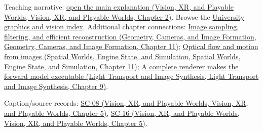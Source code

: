 Teaching narrative: \href{../07-Vision-XR-and-Playable-Worlds/main.pdf\#nameddest=04-visual-computing-ii-ch031-sequence-models-and-attention}{open the main explanation (Vision, XR, and Playable Worlds, Vision, XR, and Playable Worlds, Chapter 2)}. Browse the \hyperref[appendix-a6d556a4ef50-university-graphics-vision-and-photography---independent-series]{University graphics and vision index}. Additional chapter connections: \href{../03-Geometry-Cameras-and-Image-Formation/main.pdf\#nameddest=03-visual-computing-i-ch004-image-sampling-filtering-and-efficient-reconstruction}{Image sampling, filtering, and efficient reconstruction (Geometry, Cameras, and Image Formation, Geometry, Cameras, and Image Formation, Chapter 11)}; \href{../05-Spatial-Worlds-Engine-State-and-Simulation/main.pdf\#nameddest=04-visual-computing-ii-ch030-optical-flow-and-motion-from-images}{Optical flow and motion from images (Spatial Worlds, Engine State, and Simulation, Spatial Worlds, Engine State, and Simulation, Chapter 11)}; \href{../04-Light-Transport-and-Image-Synthesis/main.pdf\#nameddest=04-visual-computing-ii-ch035-a-complete-renderer-makes-the-forward-model-executable}{A complete renderer makes the forward model executable (Light Transport and Image Synthesis, Light Transport and Image Synthesis, Chapter 9)}.

Caption/source records: \href{../07-Vision-XR-and-Playable-Worlds/main.pdf\#nameddest=04-visual-computing-ii-ch036-sc-08---stanford-cs231n-spring-2025-lecture-8-attention-and-transformers}{SC-08 (Vision, XR, and Playable Worlds, Vision, XR, and Playable Worlds, Chapter 5)}, \href{../07-Vision-XR-and-Playable-Worlds/main.pdf\#nameddest=04-visual-computing-ii-ch036-sc-16---stanford-cs231n-deep-learning-for-computer-vision-spring-2025-lecture-16-vision-and-language}{SC-16 (Vision, XR, and Playable Worlds, Vision, XR, and Playable Worlds, Chapter 5)}.
